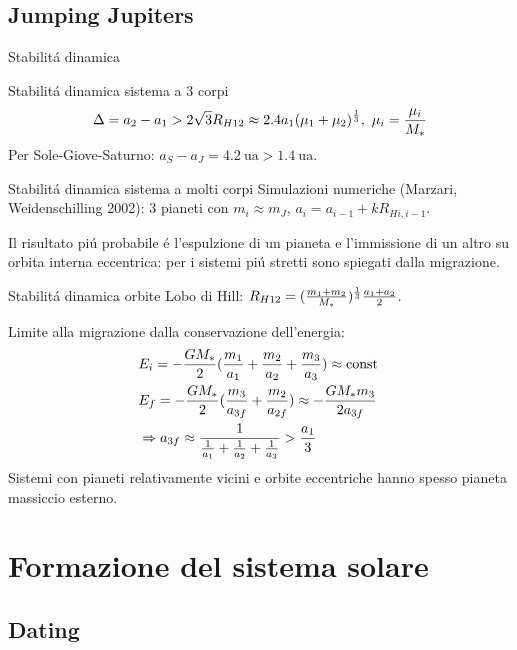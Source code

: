 \subsection{Jumping Jupiters}

\begin{frame}{Stabilit\'a dinamica}
\begin{block}{Stabilit\'a dinamica sistema a 3 corpi}
\begin{equation*}
\Delta=a_2-a_1>2\sqrt{3}R_{H12}\approx2.4a_1(\mu_1+\mu_2)\expy{\frac{1}{3}},\ \mu_i=\frac{\mu_i}{M_*}
\end{equation*}
Per Sole-Giove-Saturno: $a_S-a_J=\SI{4.2}{\astronomicalunit}>\SI{1.4}{\astronomicalunit}$.
\end{block}
\begin{block}{Stabilit\'a dinamica sistema a molti corpi}
Simulazioni numeriche (Marzari, Weidenschilling 2002): 3 pianeti con $m_i\approx m_J$, $a_i=a_{i-1}+kR_{Hi,i-1}$.

Il risultato pi\'u probabile \'e l'espulzione di un pianeta e l'immissione di un altro su orbita interna eccentrica: per i sistemi pi\'u stretti sono spiegati dalla migrazione.
\end{block}
\end{frame}

\begin{wordonframe}{Stabilit\'a dinamica orbite}
Lobo di Hill: $R_{H12}=(\frac{m_1+m_2}{M_*})^{\frac{1}{3}}\frac{a_1+a_2}{2}$.

Limite alla migrazione dalla conservazione dell'energia:
\begin{align*}
&E_i=-\frac{GM_*}{2}(\frac{m_1}{a_1}+\frac{m_2}{a_2}+\frac{m_3}{a_3})\approx\operatorname{const}{}\\
&E_f=-\frac{GM_*}{2}(\frac{m_3}{a_{3f}}+\frac{m_2}{a_{2f}})\approx-\frac{GM_*m_3}{2a_{3f}}\\
&\Rightarrow a_{3f}\approx\frac{1}{\frac{1}{a_1}+\frac{1}{a_2}+\frac{1}{a_3}}>\frac{a_1}{3}
\end{align*}
Sistemi con pianeti relativamente vicini e orbite eccentriche hanno spesso pianeta massiccio esterno.
\end{wordonframe}

\section{Formazione del sistema solare}

\subsection{Dating}

